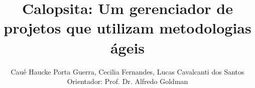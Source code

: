 \documentclass[a2]{sciposter}
\title{Calopsita: Um gerenciador de projetos que utilizam metodologias ágeis}
\author{Cauê Haucke Porta Guerra, Cecilia Fernandes, Lucas Cavalcanti dos Santos\\ Orientador: Prof. Dr. Alfredo Goldman}
\institute{Instituto de Matemática e Estatística\\
Universidade de São Paulo}
\begin{document}
\renewcommand{\titlesize}{\Huge}
\renewcommand{\authorsize}{\large}
\renewcommand{\instsize}{\small}

\maketitle
\end{document}
